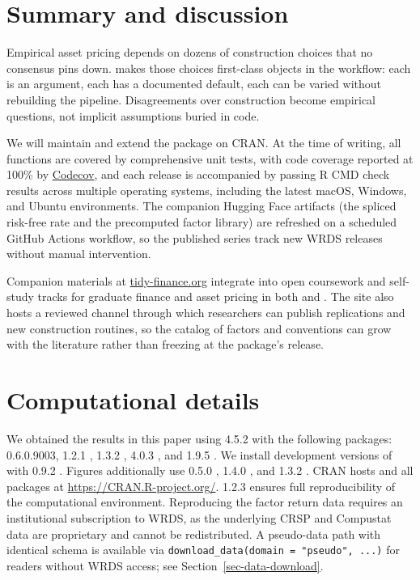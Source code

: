 \documentclass[
  article]{jss}
\begin{document}
\section{Summary and discussion}\label{sec-summary}

Empirical asset pricing depends on dozens of construction choices that
no consensus pins down.  makes those choices
first-class objects in the workflow: each is an argument, each has a
documented default, each can be varied without rebuilding the pipeline.
Disagreements over construction become empirical questions, not implicit
assumptions buried in code.

We will maintain and extend the package on CRAN. At the time of writing,
all functions are covered by comprehensive unit tests, with code
coverage reported at 100\% by
\href{https://app.codecov.io/gh/tidy-finance/r-tidyfinance}{Codecov},
and each release is accompanied by passing R CMD check results across
multiple operating systems, including the latest macOS, Windows, and
Ubuntu environments. The companion Hugging Face artifacts (the spliced
risk-free rate and the precomputed factor library) are refreshed on a
scheduled GitHub Actions workflow, so the published series track new
WRDS releases without manual intervention.

Companion materials at \href{https://tidy-finance.org}{tidy-finance.org}
integrate  into open coursework and self-study tracks
for graduate finance and asset pricing in both  and
. The site also hosts a reviewed channel through which
researchers can publish replications and new construction routines, so
the catalog of factors and conventions can grow with the literature
rather than freezing at the package's release.

\section*{Computational details}\label{computational-details}

We obtained the results in this paper using  4.5.2 with the
following packages:  0.6.0.9003,  1.2.1
\citep{dplyr},  1.3.2 \citep{tidyr},  4.0.3
\citep{ggplot2}, and  1.9.5 \citep{lubridate}. We install
development versions of  with  0.9.2
\citep{pak}. Figures additionally use  0.5.0
\citep{ggforce},  1.4.0 \citep{scales}, and 
1.3.2 \citep{patchwork}. CRAN hosts  and all packages at
\url{https://CRAN.R-project.org/}.  1.2.3 \citep{renv} ensures
full reproducibility of the computational environment. Reproducing the
factor return data requires an institutional subscription to WRDS, as
the underlying CRSP and Compustat data are proprietary and cannot be
redistributed. A pseudo-data path with identical schema is available via
\texttt{download\_data(domain\ =\ "pseudo",\ ...)} for readers without
WRDS access; see Section~\ref{sec-data-download}.
\end{document}
